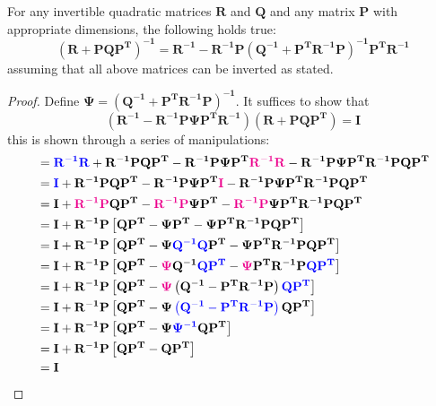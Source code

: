 \documentclass[12pt]{article}
\newcommand{\mat}[1]{\mathbf{#1}}
\newcommand{\matT}[1]{\mathbf{#1^T}}
\newcommand{\parentheses}[1]{\left(#1\right)}
\newcommand{\blue}[1]{\color{blue}#1\color{black}}
\newcommand{\magenta}[1]{\color{magenta}#1\color{black}}
\begin{document}
\begin{lem}
For any invertible quadratic matrices $\mat{R}$ and $\mat{Q}$ and any matrix $\mat{P}$ with appropriate dimensions, the following holds true:
\begin{equation}
\parentheses{\mat{R} + \mat{PQ}\matT{P}}^\mathbf{{-1}} = \mat{R^{-1}} - \mat{R^{-1}}\mat{P}\parentheses{\mat{Q^{-1}} + \matT{P}\mat{R^{-1}P}}^\mathbf{{-1}}\matT{P}\mat{R^{-1}}
\end{equation}
assuming that all above matrices can be inverted as stated.

\begin{proof}
Define $\mat{\Psi} = \parentheses{\mat{Q^{-1}} + \matT{P}\mat{R^{-1}}\mat{P}}^\mathbf{-1}$. It suffices to show that
\begin{equation*}
\parentheses{\mat{R^{-1}} - \mat{R^{-1}}\mat{P}\mat{\Psi}\matT{P}\mat{R^{-1}}} \parentheses{\mat{R} + \mat{PQ}\matT{P}} = \mat{I}
\end{equation*}
this is shown through a series of manipulations:
\begin{equation}
\begin{aligned}
    &= \blue{\mat{R^{-1} R}} + \mat{R^{-1} P Q P^T} - \mat{R^{-1} P \Psi P^T \magenta{R^{-1} R}} - \mat{R^{-1} P \Psi P^T R^{-1} P Q P^T} \\
    &= \blue{\mat{I}} + \mat{R^{-1} P Q P^T} - \mat{R^{-1} P \Psi P^T \magenta{I}} - \mat{R^{-1} P \Psi P^T R^{-1} P Q P^T}\\
    &= \mat{I} + \mat{\magenta{R^{-1} P} Q P^T} - \mat{\magenta{R^{-1} P} \Psi P^T} - \mat{\magenta{R^{-1} P} \Psi P^T R^{-1} P Q P^T}\\
    &= \mat{I} + \mat{R^{-1} P} \left[\mat{Q P^T} - \mat{\Psi P^T} - \mat{\Psi P^T R^{-1} P Q P^T}\right]\\
    &= \mat{I} + \mat{R^{-1} P} \left[\mat{Q P^T} - \mat{\Psi \blue{Q^{-1} Q} P^T} - \mat{\Psi P^T R^{-1} P Q P^T}\right]\\
    &= \mat{I} + \mat{R^{-1} P} \left[\mat{Q P^T} - \mat{\magenta{\Psi} Q^{-1}\blue{ Q P^T}} - \mat{\magenta{\Psi} P^T R^{-1} P \blue{Q P^T}}\right]\\
    &= \mat{I} + \mat{R^{-1} P} \left[\mat{Q P^T} - \mat{\magenta{\Psi}} \left(\mat{ Q^{-1}} - \mat{P^T R^{-1} P}\right)\mat{\blue{Q P^T}}\right]\\
    &= \mat{I} + \mat{R^{-1} P} \left[\mat{Q P^T} - \mat{\Psi} \blue{\left(\mat{ Q^{-1}} - \mat{P^T R^{-1} P}\right)}\mat{Q P^T}\right]\\
    &= \mat{I} + \mat{R^{-1} P} \left[\mat{Q P^T} - \mat{\Psi} \blue{\mat{\Psi^{-1}}}\mat{Q P^T}\right]\\
    &= \mat{I} + \mat{R^{-1} P} \left[\mat{Q P^T} - \mat{Q P^T}\right]\\
    &= \mat{I} 
\end{aligned}
\end{equation}

\end{proof}
\label{lem:inversion-lemma}

\end{lem}



\end{document}
